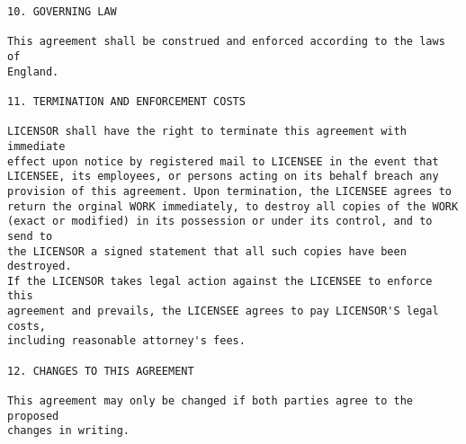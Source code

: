 \begin{verbatim}
10. GOVERNING LAW

This agreement shall be construed and enforced according to the laws of
England.

11. TERMINATION AND ENFORCEMENT COSTS

LICENSOR shall have the right to terminate this agreement with immediate
effect upon notice by registered mail to LICENSEE in the event that
LICENSEE, its employees, or persons acting on its behalf breach any
provision of this agreement. Upon termination, the LICENSEE agrees to
return the orginal WORK immediately, to destroy all copies of the WORK
(exact or modified) in its possession or under its control, and to send to
the LICENSOR a signed statement that all such copies have been destroyed.
If the LICENSOR takes legal action against the LICENSEE to enforce this
agreement and prevails, the LICENSEE agrees to pay LICENSOR'S legal costs,
including reasonable attorney's fees.

12. CHANGES TO THIS AGREEMENT

This agreement may only be changed if both parties agree to the proposed
changes in writing.

\end{verbatim}


\nocite{TitlesOn}














